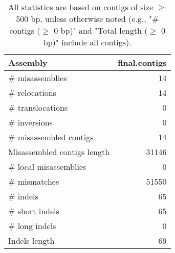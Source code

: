 \documentclass[12pt,a4paper]{article}
\begin{document}
\begin{table}[ht]
\begin{center}
\caption{All statistics are based on contigs of size $\geq$ 500 bp, unless otherwise noted (e.g., "\# contigs ($\geq$ 0 bp)" and "Total length ($\geq$ 0 bp)" include all contigs).}
\begin{tabular}{|l*{1}{|r}|}
\hline
Assembly & final.contigs \\ \hline
\# misassemblies & 14 \\ \hline
\hspace{5mm}\# relocations & 14 \\ \hline
\hspace{5mm}\# translocations & 0 \\ \hline
\hspace{5mm}\# inversions & 0 \\ \hline
\# misassembled contigs & 14 \\ \hline
Misassembled contigs length & 31146 \\ \hline
\# local misassemblies & 0 \\ \hline
\# mismatches & 51550 \\ \hline
\# indels & 65 \\ \hline
\hspace{5mm}\# short indels & 65 \\ \hline
\hspace{5mm}\# long indels & 0 \\ \hline
Indels length & 69 \\ \hline
\end{tabular}
\end{center}
\end{table}
\end{document}
